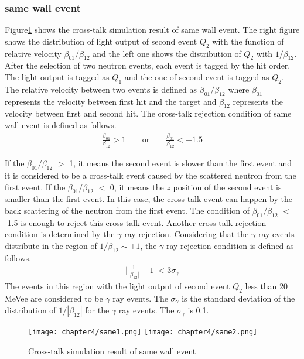 \subsubsection{same wall event}
Figure\ref{fig:samewall} shows the cross-talk simulation result of same wall event. The right figure shows the distribution of light output of second event $Q_2$ with the function of relative velocity $\beta_{01}/\beta_{12}$ and the left one shows the distribution of $Q_2$ with $1/\beta_{12}$. After the selection of two neutron events, each event is tagged by the hit order. The light output is tagged as $Q_1$ and the one of second event is tagged as $Q_2$. The relative velocity between two events is defined as $\beta_{01}/\beta_{12}$ where $\beta_{01}$ represents the velocity between first hit and the target and $\beta_{12}$ represents the velocity between first and second hit. The cross-talk rejection condition of same wall event is defined as follows.
\begin{align}
    \frac{\beta_{01}}{\beta_{12}} > 1 \qquad \text{or} \qquad  \frac{\beta_{01}}{\beta_{12}} < -1.5
\end{align}

If the $\beta_{01}/\beta_{12}$ $>$ 1, it means the second event is slower than the first event and it is considered to be a cross-talk event caused by the scattered neutron from the first event. If the $\beta_{01}/\beta_{12}$ $<$ 0, it means the $z$ position of the second event is smaller than the first event. In this case, the cross-talk event can happen by the back scattering of the neutron from the first event. The condition of $\beta_{01}/\beta_{12}$ $<$ -1.5 is enough to reject this cross-talk event.
Another cross-talk rejection condition is determined by the $\gamma$ ray rejection. Considering that the $\gamma$ ray events distribute in the region of $1/\beta_{12} \sim \pm1$, the $\gamma$ ray rejection condition is defined as follows.
\begin{align}
    \bigg|\frac{1}{|\beta_{12}|} - 1\bigg| < 3\sigma_\gamma
\end{align}
The events in this region with the light output of second event $Q_2$ less than 20 MeVee are considered to be $\gamma$ ray events. The $\sigma_\gamma$ is the standard deviation of the distribution of $1/|\beta_{12}|$ for the $\gamma$ ray events. The $\sigma_\gamma$ is 0.1. 
\begin{figure}[h]
    \centering
    \texttt{[image: chapter4/same1.png]}\hspace{0.5cm}
    \texttt{[image: chapter4/same2.png]}
    \caption{Cross-talk simulation result of same wall event}
    \label{fig:samewall}
\end{figure}

